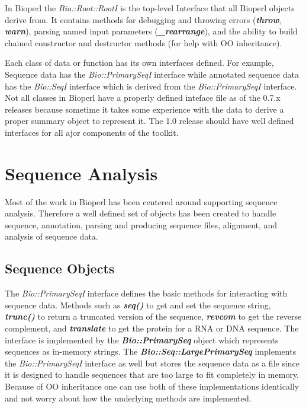 \documentclass{article}
\begin{document}
\par
In Bioperl the \emph{Bio::Root::RootI} is the top-level Interface that all
Bioperl objects derive from.  It contains methods for debugging and
throwing errors ({\it \bf throw}, {\it \bf warn}), parsing named input
parameters ({\it \bf \_rearrange}), and the ability to build chained
constructor and destructor methods (for help with OO inheritance).

\par
Each class of data or function has its own interfaces defined.  For
example, Sequence data has the \emph{Bio::PrimarySeqI} interface while
annotated sequence data has the \emph{Bio::SeqI} interface which
is derived from the \emph{Bio::PrimarySeqI} interface.  Not all
classes in Bioperl have a properly defined inteface file as of the
0.7.x releases because sometime it takes some experience with the data
to derive a proper summary object to represent it. The 1.0 release
should have well defined interfaces for all ajor components of the toolkit. 

\section{Sequence Analysis}

Most of the work in Bioperl has been centered around supporting
sequence analysis.  Therefore a well defined set of objects has been
created to handle sequence, annotation, parsing and producing sequence
files, alignment, and analysis of sequence data.  

\subsection{Sequence Objects}

The \emph{Bio::PrimarySeqI} interface defines the basic methods for
interacting with sequence data.  Methods such as {\it \bf seq()} to
get and set the sequence string, {\it \bf trunc()} to return a truncated
version of the sequence, {\it \bf revcom} to get the reverse complement,
and {\it \bf translate} to get the protein for a RNA or DNA sequence.  The
interface is implemented by the \emph{\bf Bio::PrimarySeq} object
which represents sequences as in-memory strings.  The
\emph{\bf Bio::Seq::LargePrimarySeq} implements the
\emph{Bio::PrimarySeqI} interface as well but stores the sequence data
as a file since it is designed to handle sequences that are too large
to fit completely in memory.  Because of OO inheritance one can use
both of these implementations identically and not worry about how the
underlying methods are implemented.   
\end{document}
